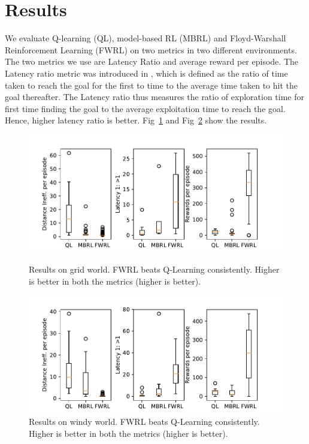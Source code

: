 \section{Results}

We evaluate Q-learning (QL), model-based RL (MBRL) and Floyd-Warshall
Reinforcement Learning (FWRL) on two metrics in two different environments. The
two metrics we use are Latency Ratio and average reward per episode. The Latency
ratio metric was introduced in \citet{MiPaViICLR2017}, which is defined as the
ratio of time taken to reach the goal for the first to time to the average time
taken to hit the goal thereafter. The Latency ratio thus measures the ratio of
exploration time for first time finding the goal to the average exploitation
time to reach the goal. Hence, higher latency ratio is better.
Fig~\ref{fig:ql-fw-grid-world-results} and
Fig~\ref{fig:ql-fw-windy-world-results} show the results.

\begin{figure}%
\includegraphics[width=\columnwidth]{./media/metrics-grid-world.pdf}\\
\caption{Results on grid world. FWRL beats Q-Learning consistently. Higher is
  better in both the metrics (higher is better).}
\label{fig:ql-fw-grid-world-results}%
\end{figure}
\begin{figure}
\includegraphics[width=\columnwidth]{./media/metrics-windy-world.pdf}%
\caption{Results on windy world. FWRL beats Q-Learning consistently. Higher is
  better in both the metrics (higher is better).}
\label{fig:ql-fw-windy-world-results}%
\end{figure}
